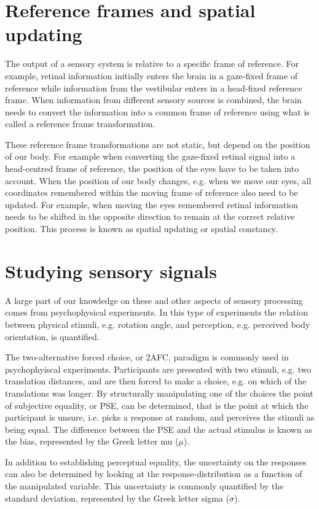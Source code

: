 \section{Reference frames and spatial updating}
The output of a sensory system is relative to a specific frame of reference. For example, retinal information initially enters the brain in a gaze-fixed frame of reference while information from the vestibular enters in a head-fixed reference frame. When information from different sensory sources is combined, the brain needs to convert the information into a common frame of reference using what is called a reference frame transformation.

These reference frame transformations are not static, but depend on the position of our body. For example when converting the gaze-fixed retinal signal into a head-centred frame of reference, the position of the eyes have to be taken into account. When the position of our body changes, e.g. when we move our eyes, all coordinates remembered within the moving frame of reference also need to be updated. For example, when moving the eyes remembered retinal information needs to be shifted in the opposite direction to remain at the correct relative position. This process is known as spatial updating or spatial constancy.

\section{Studying sensory signals}
A large part of  our knowledge on these and other aspects of sensory processing comes from psychophysical experiments. In this type of experiments the relation between physical stimuli, e.g. rotation angle, and perception, e.g. perceived body orientation, is quantified.

The two-alternative forced choice, or 2AFC, paradigm is commonly used in psychophyiscal experiments. Participants are presented with two stimuli, e.g. two translation distances, and are then forced to make a choice, e.g. on which of the translations was longer. By structurally manipulating one of the choices the point of subjective equality, or PSE, can be determined, that is the point at which the participant is unsure, i.e. picks a response at random, and perceives the stimuli as being equal. The difference between the PSE and the actual stimulus is known as the bias, represented by the Greek letter mu ($\mu$).

In addition to establishing perceptual equality, the uncertainty on the responses can also be determined by looking at the response-distribution as a function of the manipulated variable. This uncertainty is commonly quantified by the standard deviation, represented by the Greek letter sigma ($\sigma$).

